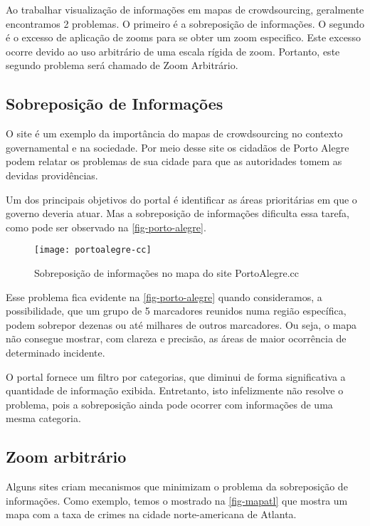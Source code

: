 Ao trabalhar visualização de informações em mapas de crowdsourcing, geralmente encontramos 2 problemas. O primeiro é  a sobreposição de informações. O segundo é  o excesso de aplicação de zooms para se obter um zoom especifico. Este excesso ocorre devido ao uso arbitrário de uma escala rígida de zoom. Portanto, este segundo problema será chamado de Zoom Arbitrário.



\subsection{Sobreposição de Informações}
O site  é um exemplo da importância do mapas de crowdsourcing no contexto governamental e na sociedade. Por meio desse site os cidadãos de Porto Alegre podem relatar os problemas de sua cidade para que as autoridades tomem as devidas providências. 

Um dos principais objetivos do portal é identificar as áreas prioritárias em que o governo deveria atuar. Mas a sobreposição de informações dificulta essa tarefa, como pode ser observado na \autoref{fig-porto-alegre}. 

\begin{figure}[htb]
	\caption{\label{fig-porto-alegre} Sobreposição de informações no mapa do site PortoAlegre.cc}
	\begin{center}
	    \texttt{[image: portoalegre-cc]}
	\end{center}
\end{figure}

Esse problema fica evidente na \autoref{fig-porto-alegre} quando consideramos, a possibilidade, que um grupo de 5 marcadores reunidos numa região específica, podem sobrepor dezenas ou até milhares de outros marcadores. Ou seja, o mapa não consegue mostrar, com clareza e precisão, as áreas de maior ocorrência de determinado incidente. 

O portal fornece um filtro por categorias, que diminui de forma significativa a quantidade de informação exibida. Entretanto, isto infelizmente não resolve o problema, pois a sobreposição ainda pode ocorrer com informações de uma mesma categoria.



\subsection{Zoom arbitrário}
Alguns sites criam mecanismos que minimizam o problema da sobreposição de informações. Como exemplo, temos o   mostrado na \autoref{fig-mapatl} que mostra um mapa com a taxa de crimes na cidade norte-americana de Atlanta. 

